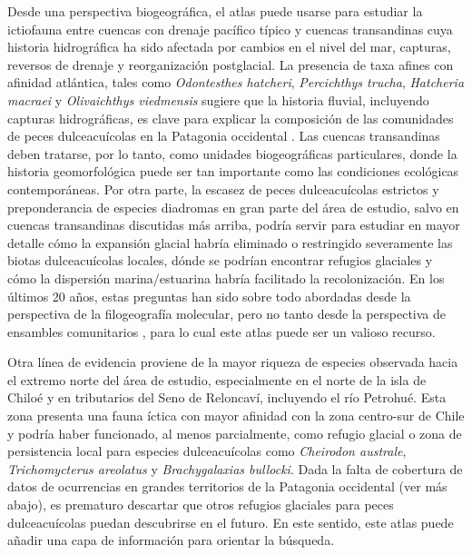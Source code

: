 \documentclass[sn-apa,pdflatex]{sn-jnl}
\begin{document}
Desde una perspectiva biogeográfica, el atlas puede usarse para estudiar
la ictiofauna entre cuencas con drenaje pacífico típico y cuencas
transandinas cuya historia hidrográfica ha sido afectada por cambios en
el nivel del mar, capturas, reversos de drenaje y reorganización
postglacial. La presencia de taxa afines con afinidad atlántica, tales
como \emph{Odontesthes hatcheri}, \emph{Percichthys trucha},
\emph{Hatcheria macraei} y \emph{Olivaichthys viedmensis} sugiere que la
historia fluvial, incluyendo capturas hidrográficas, es clave para
explicar la composición de las comunidades de peces dulceacuícolas en la
Patagonia occidental
\citep{ruzzantePhylogeographyPercichthyidaePisces2006, unmackPhylogeographyCatfishHatcheria2012, arratiaUnderstandingMorphologicalVariability2017, Ruzzante2020}.
Las cuencas transandinas deben tratarse, por lo tanto, como unidades
biogeográficas particulares, donde la historia geomorfológica puede ser
tan importante como las condiciones ecológicas contemporáneas. Por otra
parte, la escasez de peces dulceacuícolas estrictos y preponderancia de
especies diadromas en gran parte del área de estudio, salvo en cuencas
transandinas discutidas más arriba, podría servir para estudiar en mayor
detalle cómo la expansión glacial habría eliminado o restringido
severamente las biotas dulceacuícolas locales, dónde se podrían
encontrar refugios glaciales y cómo la dispersión marina/estuarina
habría facilitado la recolonización. En los últimos 20 años, estas
preguntas han sido sobre todo abordadas desde la perspectiva de la
filogeografía molecular, pero no tanto desde la perspectiva de ensambles
comunitarios \citep{cussacDistributionSouthAmerican2004}, para lo cual
este atlas puede ser un valioso recurso.

Otra línea de evidencia proviene de la mayor riqueza de especies
observada hacia el extremo norte del área de estudio, especialmente en
el norte de la isla de Chiloé
\citep{camposPresenciaCheirodonAustrale1996} y en tributarios del Seno
de Reloncaví, incluyendo el río Petrohué. Esta zona presenta una fauna
íctica con mayor afinidad con la zona centro-sur de Chile y podría haber
funcionado, al menos parcialmente, como refugio glacial o zona de
persistencia local para especies dulceacuícolas como \emph{Cheirodon
australe}, \emph{Trichomycterus areolatus} y \emph{Brachygalaxias
bullocki}. Dada la falta de cobertura de datos de ocurrencias en grandes
territorios de la Patagonia occidental (ver más abajo), es prematuro
descartar que otros refugios glaciales para peces dulceacuícolas puedan
descubrirse en el futuro. En este sentido, este atlas puede añadir una
capa de información para orientar la búsqueda.
\end{document}
